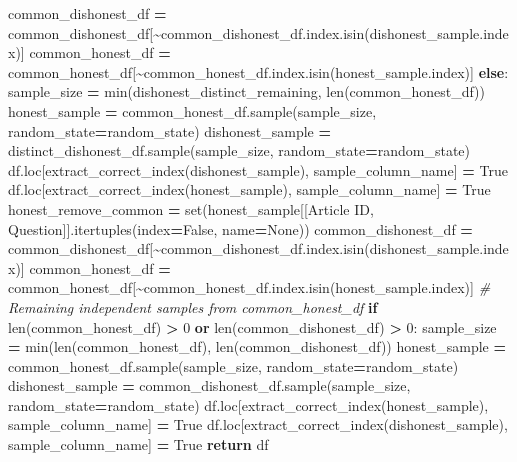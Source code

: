 \documentclass[
]{article}
\newenvironment{Shaded}{\begin{snugshade}}{\end{snugshade}}
\newcommand{\BuiltInTok}[1]{#1}
\newcommand{\CommentTok}[1]{\textcolor[rgb]{0.56,0.35,0.01}{\textit{#1}}}
\newcommand{\ControlFlowTok}[1]{\textcolor[rgb]{0.13,0.29,0.53}{\textbf{#1}}}
\newcommand{\DecValTok}[1]{\textcolor[rgb]{0.00,0.00,0.81}{#1}}
\newcommand{\KeywordTok}[1]{\textcolor[rgb]{0.13,0.29,0.53}{\textbf{#1}}}
\newcommand{\NormalTok}[1]{#1}
\newcommand{\OperatorTok}[1]{\textcolor[rgb]{0.81,0.36,0.00}{\textbf{#1}}}
\newcommand{\StringTok}[1]{\textcolor[rgb]{0.31,0.60,0.02}{#1}}
\newcommand{\VariableTok}[1]{\textcolor[rgb]{0.00,0.00,0.00}{#1}}
\begin{document}
\begin{Shaded}
\begin{Highlighting}[]
\NormalTok{        common\_dishonest\_df }\OperatorTok{=}\NormalTok{ common\_dishonest\_df[}\OperatorTok{\textasciitilde{}}\NormalTok{common\_dishonest\_df.index.isin(dishonest\_sample.index)]}
\NormalTok{        common\_honest\_df }\OperatorTok{=}\NormalTok{ common\_honest\_df[}\OperatorTok{\textasciitilde{}}\NormalTok{common\_honest\_df.index.isin(honest\_sample.index)]}
    \ControlFlowTok{else}\NormalTok{:}
\NormalTok{        sample\_size }\OperatorTok{=} \BuiltInTok{min}\NormalTok{(dishonest\_distinct\_remaining, }\BuiltInTok{len}\NormalTok{(common\_honest\_df))}
\NormalTok{        honest\_sample }\OperatorTok{=}\NormalTok{ common\_honest\_df.sample(sample\_size, random\_state}\OperatorTok{=}\NormalTok{random\_state)}
\NormalTok{        dishonest\_sample }\OperatorTok{=}\NormalTok{ distinct\_dishonest\_df.sample(sample\_size, random\_state}\OperatorTok{=}\NormalTok{random\_state)}
\NormalTok{        df.loc[extract\_correct\_index(dishonest\_sample), sample\_column\_name] }\OperatorTok{=} \VariableTok{True}
\NormalTok{        df.loc[extract\_correct\_index(honest\_sample), sample\_column\_name] }\OperatorTok{=} \VariableTok{True}
\NormalTok{        honest\_remove\_common }\OperatorTok{=} \BuiltInTok{set}\NormalTok{(honest\_sample[[}\StringTok{\textquotesingle{}Article ID\textquotesingle{}}\NormalTok{, }\StringTok{\textquotesingle{}Question\textquotesingle{}}\NormalTok{]].itertuples(index}\OperatorTok{=}\VariableTok{False}\NormalTok{, name}\OperatorTok{=}\VariableTok{None}\NormalTok{))}
\NormalTok{        common\_dishonest\_df }\OperatorTok{=}\NormalTok{ common\_dishonest\_df[}\OperatorTok{\textasciitilde{}}\NormalTok{common\_dishonest\_df.index.isin(dishonest\_sample.index)]}
\NormalTok{        common\_honest\_df }\OperatorTok{=}\NormalTok{ common\_honest\_df[}\OperatorTok{\textasciitilde{}}\NormalTok{common\_honest\_df.index.isin(honest\_sample.index)]}
    \CommentTok{\# Remaining independent samples from common\_honest\_df}
    \ControlFlowTok{if} \BuiltInTok{len}\NormalTok{(common\_honest\_df) }\OperatorTok{\textgreater{}} \DecValTok{0} \KeywordTok{or} \BuiltInTok{len}\NormalTok{(common\_dishonest\_df) }\OperatorTok{\textgreater{}} \DecValTok{0}\NormalTok{:}
\NormalTok{        sample\_size }\OperatorTok{=} \BuiltInTok{min}\NormalTok{(}\BuiltInTok{len}\NormalTok{(common\_honest\_df), }\BuiltInTok{len}\NormalTok{(common\_dishonest\_df))}
\NormalTok{        honest\_sample }\OperatorTok{=}\NormalTok{ common\_honest\_df.sample(sample\_size, random\_state}\OperatorTok{=}\NormalTok{random\_state)}
\NormalTok{        dishonest\_sample }\OperatorTok{=}\NormalTok{ common\_dishonest\_df.sample(sample\_size, random\_state}\OperatorTok{=}\NormalTok{random\_state)}
\NormalTok{        df.loc[extract\_correct\_index(honest\_sample), sample\_column\_name] }\OperatorTok{=} \VariableTok{True}
\NormalTok{        df.loc[extract\_correct\_index(dishonest\_sample), sample\_column\_name] }\OperatorTok{=} \VariableTok{True}
    \ControlFlowTok{return}\NormalTok{ df}
  

\end{Highlighting}
\end{Shaded}
\end{document}
